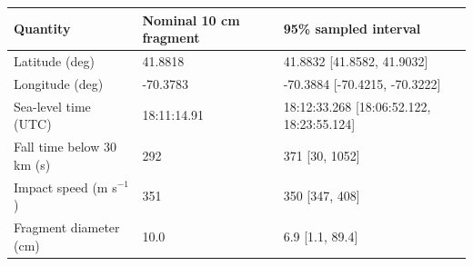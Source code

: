 \begin{tabular}{lll}
  \toprule
  Quantity & Nominal 10 cm fragment & 95\% sampled interval \\
  \midrule
  Latitude (deg) & 41.8818 & 41.8832 [41.8582, 41.9032] \\
  Longitude (deg) & -70.3783 & -70.3884 [-70.4215, -70.3222] \\
  Sea-level time (UTC) & 18:11:14.91 & 18:12:33.268 [18:06:52.122, 18:23:55.124] \\
  Fall time below 30 km (s) & 292 & 371 [30, 1052] \\
  Impact speed (m s$^{-1}$) & 351 & 350 [347, 408] \\
  Fragment diameter (cm) & 10.0 & 6.9 [1.1, 89.4] \\
  \bottomrule
\end{tabular}
